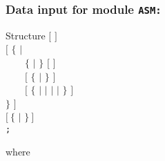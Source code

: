 \subsubsection{Data input for module {\tt ASM:}}\label{sect:descasm}

\begin{DataStructure}{Structure }
$[$   $]$ \\
$[$ $\{$  $|$ \\
~~~~$\{$  $|$  $\}$ $[$  $]$ \\
~~~~$[$ $\{$  $|$  $\}$ $]$ \\
~~~~$[$  $\{$  $|$  $|$  $|$  $|$  $\}$ $]$ \\
$\}$ $]$ \\
$[~\{$  $|$  $\}~]$ \\
{\tt ;}
\end{DataStructure}

\noindent
where

